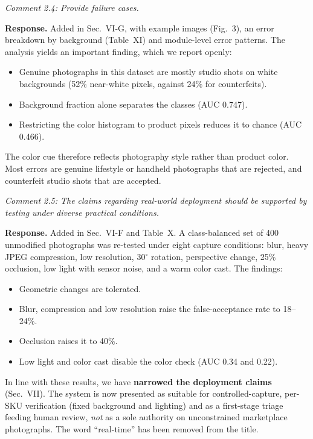 \documentclass[10pt,a4paper]{article}
\newenvironment{comment}{\par\medskip\noindent\begin{minipage}{\linewidth}\color{black!70}\itshape}{\end{minipage}\par\smallskip}
\begin{document}
\begin{comment}Comment 2.4: Provide failure cases.\end{comment}
\textbf{Response.} Added in Sec.~VI-G, with example images (Fig.~3), an error breakdown by background (Table~XI) and module-level error patterns. The analysis yields an important finding, which we report openly:
\begin{itemize}[nosep,leftmargin=1.2em]
\item Genuine photographs in this dataset are mostly studio shots on white backgrounds (52\% near-white pixels, against 24\% for counterfeits).
\item Background fraction alone separates the classes (AUC 0.747).
\item Restricting the color histogram to product pixels reduces it to chance (AUC 0.466).
\end{itemize}
The color cue therefore reflects photography style rather than product color. Most errors are genuine lifestyle or handheld photographs that are rejected, and counterfeit studio shots that are accepted.

\begin{comment}Comment 2.5: The claims regarding real-world deployment should be supported by testing under diverse practical conditions.\end{comment}
\textbf{Response.} Added in Sec.~VI-F and Table~X. A class-balanced set of 400 unmodified photographs was re-tested under eight capture conditions: blur, heavy JPEG compression, low resolution, 30$^\circ$ rotation, perspective change, 25\% occlusion, low light with sensor noise, and a warm color cast. The findings:
\begin{itemize}[nosep,leftmargin=1.2em]
\item Geometric changes are tolerated.
\item Blur, compression and low resolution raise the false-acceptance rate to 18--24\%.
\item Occlusion raises it to 40\%.
\item Low light and color cast disable the color check (AUC 0.34 and 0.22).
\end{itemize}
In line with these results, we have \textbf{narrowed the deployment claims} (Sec.~VII). The system is now presented as suitable for controlled-capture, per-SKU verification (fixed background and lighting) and as a first-stage triage feeding human review, \emph{not} as a sole authority on unconstrained marketplace photographs. The word ``real-time'' has been removed from the title.
\end{document}
